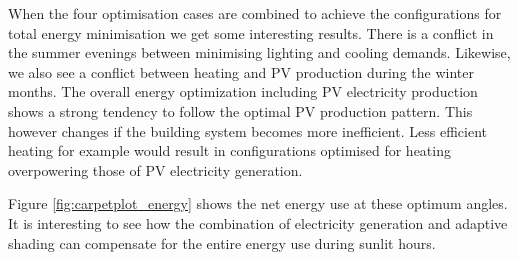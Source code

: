 When the four optimisation cases are combined to achieve the configurations for total energy minimisation we get some interesting results. There is a conflict in the summer evenings between minimising lighting and cooling demands. Likewise, we also see a conflict between heating and PV production during the winter months. The overall energy optimization including PV electricity production shows a strong tendency to follow the optimal PV production pattern. This however changes if the building system becomes more inefficient. Less efficient heating for example would result in configurations optimised for heating overpowering those of PV electricity generation.


Figure \ref{fig:carpetplot_energy} shows the net energy use at these optimum angles. It is interesting to see how the combination of electricity generation and adaptive shading can compensate for the entire energy use during sunlit hours.


